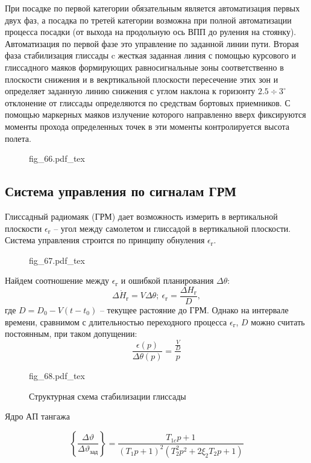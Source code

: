 \documentclass{article}
\newcommand{\incfig}[1]{
    {#1.pdf_tex}
}
\begin{document}
При посадке по первой категории обязательным является автоматизация первых двух фаз, а посадка по третей категории возможна при полной автоматизации процесса посадки (от выхода на продольную ось ВПП до руления на стоянку).
Автоматизация по первой фазе это управление по заданной линии пути. Вторая фаза стабилизация глиссады c жесткая заданная линия с помощью курсового и глиссадного маяков формирующих равносигнальные зоны соответственно в плоскости снижения и в векртикальной плоскости пересечение этих зон и определяет заданную линию снижения с углом наклона к горизонту $2.5 \div 3^\circ$ отклонение от глиссады определяются по средствам бортовых приемников.
С помощью маркерных маяков излучение которого направленно вверх фиксируются моменты прохода определенных точек в эти моменты контролируется высота полета. 
\begin{figure}[H]
    \centering
    \incfig{fig_66}
    \label{fig:fig_66}
\end{figure}

\subsection{Система управления по сигналам ГРМ}
Глиссадный радиомаяк (ГРМ) дает возможность измерить в вертикальной плоскости $\epsilon_\text{г}$  -- угол между самолетом и глиссадой в вертикальной плоскости. Система управления строится по принципу обнуления $\epsilon_\text{г}$.
\begin{figure}[H]
    \centering
    \incfig{fig_67}
    \label{fig:fig_67}
\end{figure}

Найдем соотношение между $\epsilon_\text{г}$ и ошибкой планирования $\Delta \theta$:
\[
    \Delta \dot{H}_{\text{г}} = V \Delta \theta; \ \epsilon_\text{г} = \frac{\Delta H_\text{г}}{D},
\]
где $D = D_0 - V(t-t_0)$ -- текущее растояние до ГРМ.
Однако на интервале времени, сравнимом с длительностью переходного процесса $\epsilon_\text{г}$, $D$ можно считать постоянным, при таком допущении:
\[
    \frac{\epsilon(p)}{\Delta \theta(p)} = \frac{\frac{V}{D}}{p}
\]

\begin{figure}[H]
    \centering
    \incfig{fig_68}
    \caption{Структурная схема стабилизации глиссады}
    \label{fig:fig_68}
\end{figure}
Ядро АП тангажа

\[
    \left\{ \frac{\Delta \vartheta}{\Delta \vartheta_\text{зад}} \right\}  = \frac{T_{1c}p + 1}{(T_{1}p + 1)^2 ( T_2^2p^2 + 2 \xi_2 T_2 p + 1 )}
\]
\end{document}
